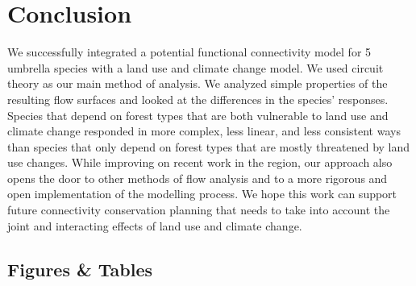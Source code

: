 \section{Conclusion}

We successfully integrated a potential functional connectivity model for 5 umbrella species with a land use and climate change model. We used circuit theory as our main method of analysis. We analyzed simple properties of the resulting flow surfaces and looked at the differences in the species’ responses. Species that depend on forest types that are both vulnerable to land use and climate change responded in more complex, less linear, and less consistent ways than species that only depend on forest types that are mostly threatened by land use changes. While improving on recent work in the region, our approach also opens the door to other methods of flow analysis and to a more rigorous and open implementation of the modelling process. We hope this work can support future connectivity conservation planning that needs to take into account the joint and interacting effects of land use and climate change. \\


\newpage
\begin{center}
\section*{Figures \& Tables}
\end{center}


